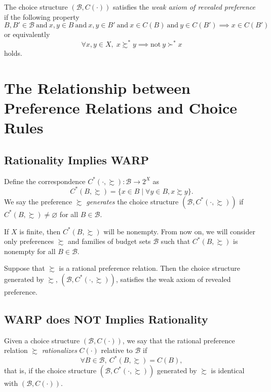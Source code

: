 \documentclass[12pt,fleqn]{book} %
\begin{document}
\begin{definition}
	The choice structure $(\mathcal{B},C(\cdot))$ satisfies the \emph{weak axiom of revealed preference} if the following property
	\[
	B,B'\in \mathcal{B}\ \text{and}\ x,y\in B\ \text{and}\ x,y\in B'\ \text{and}\ x\in C(B)\ \text{and}\ y\in C(B')\implies x\in C(B')
	\]
	or equivalently
	\[
	\forall x,y\in X,\;x\succsim^*y\implies\text{not}\ y\succ^*x
	\]
	holds.
\end{definition}

\section{The Relationship between Preference Relations and Choice Rules }

\subsection{Rationality Implies WARP}
\vspace{4pt}
\begin{definition}
	Define the correspondence $C^*(\cdot,\succsim):\mathcal{B}\rightarrow 2^X$ as 
	\[
	C^*(B,\succsim)=\{x\in B\;|\;\forall y\in B, x\succsim y\}.
	\]
	We say the preference $\succsim$ \emph{generates} the choice structure $(\mathcal{B},C^*(\cdot,\succsim))$ if $C^*(B,\succsim)\ne\varnothing$ for all $B\in\mathcal{B}$.
	
\end{definition}

\begin{remark}
    If $X$ is finite, then $C^*(B,\succsim)$ will be nonempty. From now on, we will consider only preferences $\succsim$ and families of budget sets $\mathcal{B}$ such that $C^*(B,\succsim)$ is nonempty for all $B\in\mathcal{B}$.
\end{remark}

\begin{proposition}
	Suppose that $\succsim$ is a rational preference relation. Then the choice structure generated by $\succsim$, $(\mathcal{B},C^*(\cdot,\succsim))$, satisfies the weak axiom of revealed preference. 
\end{proposition}

\subsection{WARP does NOT Implies Rationality}
\vspace{4pt}
\begin{definition}[Rationalization]
	Given a choice structure $(\mathcal{B},C(\cdot))$, we say that the rational preference	relation $\succsim$ \emph{rationalizes} $C(\cdot)$ relative to $\mathcal{B}$ if
	\[
	\forall B\in\mathcal{B},\ C^*(B,\succsim)=C(B),
	\]
	that is, if the choice structure $(\mathcal{B},C^*(\cdot,\succsim))$  generated by $\succsim$ is identical with $(\mathcal{B},C(\cdot))$.
\end{definition}
\end{document}
